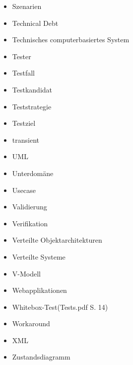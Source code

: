 \begin{itemize}
\item 	Szenarien
\item 	Technical Debt
\item 	Technisches computerbasiertes System
\item 	Tester
\item 	Testfall
\item 	Testkandidat
\item 	Teststrategie
\item 	Testziel
\item 	transient
\item 	UML
\item 	Unterdomäne
\item 	Usecase
\item 	Validierung
\item 	Verifikation
\item 	Verteilte Objektarchitekturen
\item 	Verteilte Systeme
\item 	V-Modell
\item 	Webapplikationen
\item 	Whitebox-Test(Tests.pdf S. 14)
\item 	Workaround
\item 	XML
\item 	Zustandsdiagramm
\end{itemize}